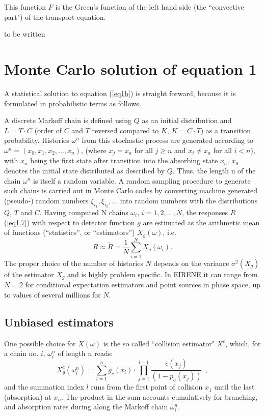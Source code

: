 This function $F$ is the Green's function of the left hand side (the ``convective part") of the transport equation.
\bigskip

to be written


\newpage
\section{Monte Carlo solution of equation 1} \label{sec1.2}

A statistical solution to equation (\ref{eq1b}) is straight forward,
because it is formulated in probabilistic terms as follows.

A discrete Markoff chain is defined using $Q$ as an initial
distribution and $L = T  \cdot  C$ (order of $C$ and $T$ reversed
compared to $K$, $K = C \cdot T$) as a transition probability. Histories $\omega^n$
from this stochastic process are generated according to $\omega^n
=   (x_0, x_1, x_2, ... , x_n)$, (where $x_j   =   x_a $ for all $
j   \ge   n$ and $ x_i   \ne   x_a $ for all $ i   <   n$), with
$x_n$ being the first state after transition into the absorbing
state $x_a$. $ x_0$ denotes the initial state distributed as
described by $Q$. Thus, the length n of the chain $ \omega^n$ is
itself a random variable. A random sampling procedure to generate
such chains is carried out in Monte Carlo codes by converting
machine generated (pseudo-) random numbers $ \xi_{i_1} , \xi_{i_2}
, ...$ into random numbers with the distributions $Q$, $T$ and
$C$. Having computed N  chains $ \omega_i$,
$i=1,2,...,N$, the responses $R$
(\ref{eq1.7}) with respect to detector function $g$ are estimated as the arithmetic mean
of functions (``statistics'', or  ``estimators'') $X_g(\omega )$, i.e.
\begin{equation} \label{eq1.8}
R  \approx   \tilde{R}   =    \frac{1}{N} \sum_{i=1}^{N}   X_g(\omega_i) .
\end{equation}
The proper choice of the number of histories $N$ depends on the variance $\sigma^2(X_g)$ of the estimator $X_g$ and is highly problem specific.
In EIRENE it can range from $N=2$ for conditional expectation estimators and point sources in phase space, up to
values of several millions for $N$.
\subsection{Unbiased estimators}\label{sec1.2.a}
One possible choice for $X(\omega )$ is the so called ``collision
estimator" $X^c$, which, for a chain no. $i$,  $\omega_i^n$ of length $n$ reads:
\begin{equation} \label{eq1.9}
X^c_g ( \omega^n_i)   =   \sum_{l=1}^{n} g_c (x_l )
 \cdot   \prod_{j=1}^{l-1}
 \frac{c(x_j )}{(1 - p_a(x_j))}   \ \ ,
\end{equation}
and the summation index $l$ runs from the first point of collision $x_1$ until the last (absorption) at $x_n$.
The product in the sum accounts cumulatively for branching, and absorption rates during along the Markoff chain $\omega_i^n$.

